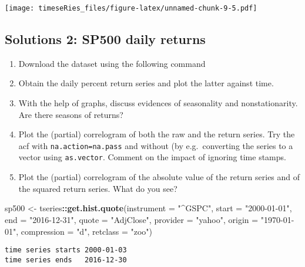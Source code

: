 \documentclass[]{book}
\newenvironment{Shaded}{\begin{snugshade}}{\end{snugshade}}
\newcommand{\DataTypeTok}[1]{\textcolor[rgb]{0.13,0.29,0.53}{#1}}
\newcommand{\KeywordTok}[1]{\textcolor[rgb]{0.13,0.29,0.53}{\textbf{#1}}}
\newcommand{\NormalTok}[1]{#1}
\newcommand{\OperatorTok}[1]{\textcolor[rgb]{0.81,0.36,0.00}{\textbf{#1}}}
\newcommand{\StringTok}[1]{\textcolor[rgb]{0.31,0.60,0.02}{#1}}
\providecommand{\tightlist}{%
  \setlength{\itemsep}{0pt}\setlength{\parskip}{0pt}}
\begin{document}
\texttt{[image: timeseRies\_files/figure-latex/unnamed-chunk-9-5.pdf]}

\hypertarget{solutions-2-sp500-daily-returns}{%
\subsection{Solutions 2: SP500 daily
returns}\label{solutions-2-sp500-daily-returns}}

\begin{enumerate}
\def\labelenumi{\arabic{enumi}.}
\tightlist
\item
  Download the dataset using the following command
\item
  Obtain the daily percent return series and plot the latter against
  time.
\item
  With the help of graphs, discuss evidences of seasonality and
  nonstationarity. Are there seasons of returns?
\item
  Plot the (partial) correlogram of both the raw and the return series.
  Try the acf with \texttt{na.action=na.pass} and without (by
  e.g.~converting the series to a vector using \texttt{as.vector}.
  Comment on the impact of ignoring time stamps.
\item
  Plot the (partial) correlogram of the absolute value of the return
  series and of the squared return series. What do you see?
\end{enumerate}

\begin{Shaded}
\begin{Highlighting}[]
\NormalTok{sp500 <-}\StringTok{ }\NormalTok{tseries}\OperatorTok{::}\KeywordTok{get.hist.quote}\NormalTok{(}\DataTypeTok{instrument =} \StringTok{"^GSPC"}\NormalTok{, }\DataTypeTok{start =} \StringTok{"2000-01-01"}\NormalTok{, }
    \DataTypeTok{end =} \StringTok{"2016-12-31"}\NormalTok{, }\DataTypeTok{quote =} \StringTok{"AdjClose"}\NormalTok{, }\DataTypeTok{provider =} \StringTok{"yahoo"}\NormalTok{, }\DataTypeTok{origin =} \StringTok{"1970-01-01"}\NormalTok{, }
    \DataTypeTok{compression =} \StringTok{"d"}\NormalTok{, }\DataTypeTok{retclass =} \StringTok{"zoo"}\NormalTok{)}
\end{Highlighting}
\end{Shaded}

\begin{verbatim}
time series starts 2000-01-03
time series ends   2016-12-30
\end{verbatim}
\end{document}
